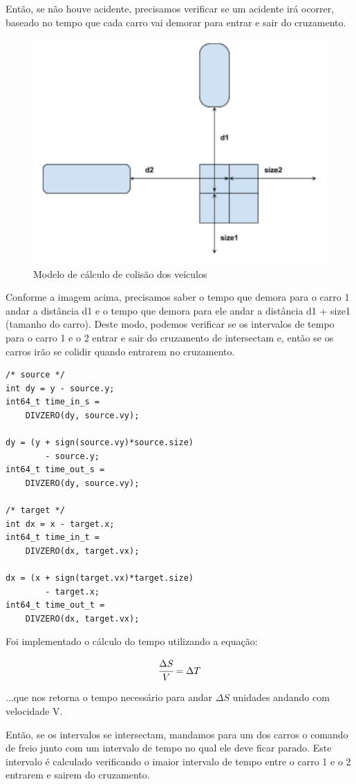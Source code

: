 \documentclass[10pt,twocolumn,letterpaper]{article}
\begin{document}
    Então, se não houve acidente, precisamos verificar se um acidente irá ocorrer, baseado no tempo que cada carro vai demorar para entrar e sair do cruzamento.

\begin{figure}[ht!]
    \center\includegraphics[width=.5\hsize]{img/car-cal}
    \caption{Modelo de cálculo de colisão dos veículos}
\end{figure}

    Conforme a imagem acima, precisamos saber o tempo que demora para o carro 1 andar a distância d1  e o tempo que demora para ele andar a distância d1 + size1 (tamanho do carro). Deste modo, podemos verificar se os intervalos de tempo para o carro 1 e o 2 entrar e sair do cruzamento de intersectam e, então se os carros irão se colidir quando entrarem no cruzamento.

\begin{lstlisting}[caption={Continuação do algoritmo de detecção de colisão (2)}, label=Algorithm]
/* source */
int dy = y - source.y;
int64_t time_in_s = 
    DIVZERO(dy, source.vy);

dy = (y + sign(source.vy)*source.size) 
        - source.y;
int64_t time_out_s =
    DIVZERO(dy, source.vy);

/* target */
int dx = x - target.x;
int64_t time_in_t = 
    DIVZERO(dx, target.vx);

dx = (x + sign(target.vx)*target.size) 
        - target.x;
int64_t time_out_t = 
    DIVZERO(dx, target.vx);
\end{lstlisting}

Foi implementado o cálculo do tempo utilizando a equação:

\begin{equation}
\cfrac{\Delta S}{V} = \Delta T
\end{equation}

    ...que nos retorna o tempo necessário para andar $\Delta S$ unidades andando com velocidade V.
    
    Então, se os intervalos se intersectam, mandamos para um dos carros o comando de freio junto com um intervalo de tempo no qual ele deve ficar parado. Este intervalo é calculado verificando o imaior intervalo de tempo entre o carro 1 e o 2 entrarem e sairem do cruzamento.
\end{document}
